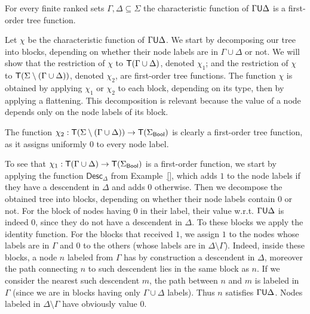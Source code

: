 \begin{lemma}\label{lem:untilmod}
    For every finite ranked sets $\Gamma, \Delta \subseteq \Sigma$  the characteristic function of $\Gamma \mathsf U \Delta$ is a first-order tree function.
\end{lemma}
\begin{pr}
Let $\chi$ be the characteristic function of $\Gamma \mathsf U \Delta$.
We start by decomposing our tree into blocks, depending on whether their node labels are in $\Gamma\cup\Delta$ or not. We will show that the restriction of $\chi$ to $\mathsf T (\Gamma\cup\Delta)$, denoted $\chi_1$; and the restriction of $\chi$ to $\mathsf T (\Sigma\setminus(\Gamma\cup\Delta))$, denoted $\chi_2$, are first-order tree functions. The function $\chi$ is obtained by applying $\chi_1$ or $\chi_2$ to each block, depending on its type, then by applying a flattening.
This decomposition is relevant because the value of a node depends only on the node labels of its block. %

The function $\chi_2:\mathsf T (\Sigma\setminus(\Gamma\cup\Delta))\to \mathsf T(\Sigma_{\sf{Bool}})$ is clearly a first-order tree function, as it assigns uniformly $0$ to every node label. 

To see that $\chi_1:\mathsf T (\Gamma\cup\Delta)\to \mathsf T(\Sigma_{\sf{Bool}})$ 
is a first-order function, we start by applying the function $\mathsf{Desc}_\Delta$ from
Example~\ref{}, which adds $1$ to the node labels if they have a descendent in $\Delta$ and adds $0$ otherwise. Then we decompose the obtained tree into blocks, depending on whether their node labels contain $0$ or not. For the block of nodes having $0$ in their label, their value w.r.t. $\Gamma\mathsf U \Delta$ is indeed $0$, since they do not have a descendent in $\Delta$. To these blocks we apply the identity function. For the blocks that received $1$, we assign $1$ to the nodes whose labels are in  $\Gamma$ and $0$ to the others (whose labels are in $\Delta\setminus\Gamma$). Indeed, inside these blocks, a node $n$ labeled from $\Gamma$ has by construction a descendent in $\Delta$, moreover the path connecting $n$ to such descendent lies in the same block as $n$. If we consider the nearest such descendent $m$, the path between $n$ and $m$  is labeled in $\Gamma$ (since we are in blocks having only $\Gamma\cup\Delta$ labels). Thus $n$ satisfies $\Gamma\mathsf U\Delta$. Nodes labeled in $\Delta\setminus\Gamma$ have obviously value $0$.      
\end{pr}


